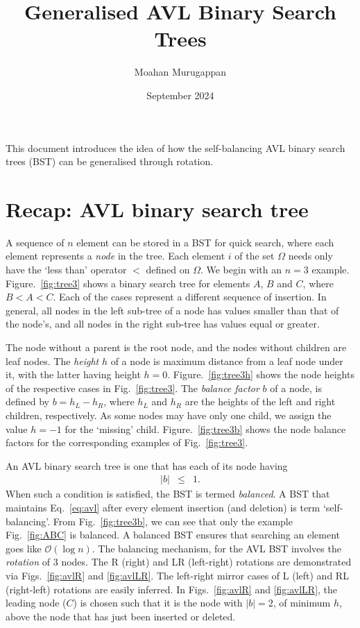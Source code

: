 \documentclass{article}
\title{Generalised AVL Binary Search Trees}
\author{Moahan Murugappan}
\date{September 2024}
\begin{document}
\maketitle

This document introduces the idea of how the self-balancing AVL binary search trees (BST) can be generalised through rotation.

\section{Recap: AVL binary search tree}
A sequence of $n$ element can be stored in a BST for quick search, where each element represents a \textit{node} in the tree. Each element $i$ of the set $\Omega$ needs only have the `less than' operator $<$ defined on $\Omega$. We begin with an $n=3$ example. Figure.~\ref{fig:tree3} shows a binary search tree for elements $A$, $B$ and $C$, where $B<A<C$. Each of the cases represent a different sequence of insertion. In general, all nodes in the left sub-tree of a node has values smaller than that of the node's, and all nodes in the right sub-tree has values equal or greater.

\vspace{5mm}

The node without a parent is the root node, and the nodes without children are leaf nodes. The \textit{height} $h$ of a node is maximum distance from a leaf node under it, with the latter having height $h=0$. Figure.~\ref{fig:tree3h} shows the node heights of the respective cases in Fig.~\ref{fig:tree3}. The \textit{balance factor} $b$ of a node, is defined by $b=h_L- h_R$, where $h_L$ and $h_R$ are the heights of the left and right children, respectively. As some nodes may have only one child, we assign the value $h=-1$ for the `missing' child. Figure.~\ref{fig:tree3b} shows the node balance factors for the corresponding examples of Fig.~\ref{fig:tree3}.

\vspace{5mm}

An AVL binary search tree is one that has each of its node having
\begin{eqnarray}
    |b| &\leq& 1. \label{eq:avl}
\end{eqnarray}
When such a condition is satisfied, the BST is termed \textit{balanced}. A BST that maintains Eq.~\ref{eq:avl} after every element insertion (and deletion) is term `self-balancing'. From Fig.~\ref{fig:tree3b}, we can see that only the example Fig.~\ref{fig:ABC} is balanced. A balanced BST ensures that searching an element goes like $\mathcal{O}(\log n)$. The balancing mechanism, for the AVL BST involves the \textit{rotation} of 3 nodes. The R (right) and LR (left-right) rotations are demonstrated via Figs.~\ref{fig:avlR} and \ref{fig:avlLR}. The left-right mirror cases of L (left) and RL (right-left) rotations are easily inferred. In Figs.~\ref{fig:avlR} and \ref{fig:avlLR}, the leading node ($C$) is chosen such that it is the node with $|b|=2$, of minimum $h$, above the node that has just been inserted or deleted.
\end{document}

